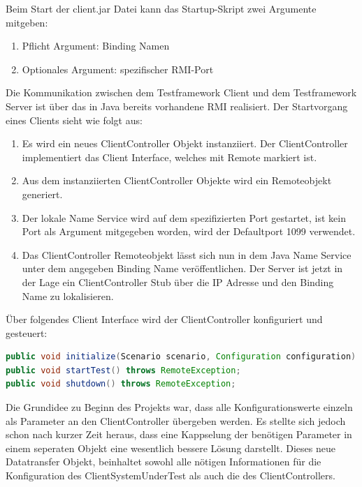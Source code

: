 Beim Start der client.jar Datei kann das Startup-Skript zwei Argumente mitgeben:
\begin{enumerate}
\item Pflicht Argument: Binding Namen
\item Optionales Argument: spezifischer RMI-Port
\end{enumerate}
Die Kommunikation zwischen dem Testframework Client und dem Testframework Server ist über das in Java bereits vorhandene RMI realisiert. Der Startvorgang eines Clients sieht wie folgt aus:
\begin{enumerate}
\item Es wird ein neues ClientController Objekt instanziiert. Der ClientController implementiert das Client Interface, welches mit Remote markiert ist.
\item Aus dem instanziierten ClientController Objekte wird ein Remoteobjekt generiert.
\item Der lokale Name Service wird auf dem spezifizierten Port gestartet, ist kein Port als Argument mitgegeben worden, wird der Defaultport 1099 verwendet.
\item Das ClientController Remoteobjekt lässt sich nun in dem Java Name Service unter dem angegeben Binding Name veröffentlichen. Der Server ist jetzt in der Lage ein ClientController Stub über die IP Adresse und den Binding Name zu lokalisieren.
\end{enumerate}

Über folgendes Client Interface wird der ClientController konfiguriert und gesteuert:
\begin{lstlisting}[language=java, breaklines=true] 	
public void initialize(Scenario scenario, Configuration configuration) throws RemoteException;
public void startTest() throws RemoteException;
public void shutdown() throws RemoteException;
\end{lstlisting}
Die Grundidee zu Beginn des Projekts war, dass alle Konfigurationswerte einzeln als Parameter an den ClientController übergeben werden. Es stellte sich je\-doch schon nach kurzer Zeit her\-aus, dass eine Kap\-pse\-lung der be\-nötigen Para\-meter in einem seperaten Objekt eine wesentlich bessere Lösung darstellt. Dieses neue Datatransfer Objekt, beinhaltet sowohl alle nötigen Informationen für die Konfiguration des ClientSystemUnderTest als auch die des ClientControllers.

